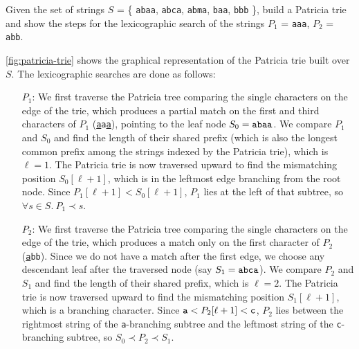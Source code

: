 \exercise

Given the set of strings $S$ = \{ {\tt abaa}, {\tt abca}, {\tt abma}, {\tt baa},
{\tt bbb} \}, build a Patricia trie and show the steps for the lexicographic
search of the strings $P_1$ = {\tt aaa}, $P_2$ = {\tt abb}.

\solution

\autoref{fig:patricia-trie} shows the graphical representation of the Patricia
trie built over $S$. The lexicographic searches are done as follows:
%
\begin{itemize}

  \item[$P_1$:] We first traverse the Patricia tree comparing the single
  characters on the edge of the trie, which produces a partial match on the
  first and third characters of $P_1$ ({\tt \underline{a}a\underline{a}}),
  pointing to the leaf node $S_0 = \text{\tt abaa}$. We compare $P_1$ and $S_0$
  and find the length of their shared prefix (which is also the longest common
  prefix among the strings indexed by the Patricia trie), which is $\ell = 1$.
  The Patricia trie is now traversed upward to find the mismatching position
  $S_0[\ell + 1]$, which is in the leftmost edge branching from the root node.
  Since $P_1[\ell + 1] < S_0[\ell + 1]$, $P_1$ lies at the left of that subtree,
  so $\forall s \in S.\ P_1 \prec s$.

  \item[$P_2$:] We first traverse the Patricia tree comparing the single
  characters on the edge of the trie, which produces a match only on the first
  character of $P_2$ ({\tt \underline{a}bb}). Since we do not have a match after
  the first edge, we choose any descendant leaf after the traversed node (say
  $S_1 = \text{\tt abca}$). We compare $P_2$ and $S_1$ and find the length of
  their shared prefix, which is $\ell = 2$. The Patricia trie is now traversed
  upward to find the mismatching position $S_1[\ell + 1]$, which is a branching
  character. Since $\text{\tt a} < P_2[\ell + 1] < \text{\tt c}$, $P_2$ lies
  between the rightmost string of the {\tt a}-branching subtree and the leftmost
  string of the {\tt c}-branching subtree, so $S_0 \prec P_2 \prec S_1$.

\end{itemize}
%
